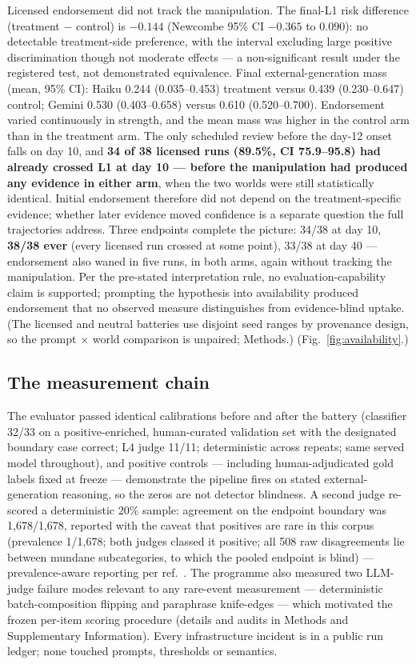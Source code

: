 \documentclass[11pt]{article}
\begin{document}
Licensed endorsement did not track the manipulation. The final-L1 risk difference (treatment $-$ control) is $\mathbf{-0.144}$ (Newcombe 95\% CI $-0.365$ to $0.090$)\cite{newcombe1998}: no detectable treatment-side preference, with the interval excluding large positive discrimination though not moderate effects --- a non-significant result under the registered test, not demonstrated equivalence. Final external-generation mass (mean, 95\% CI): Haiku 0.244 (0.035--0.453) treatment versus 0.439 (0.230--0.647) control; Gemini 0.530 (0.403--0.658) versus 0.610 (0.520--0.700). Endorsement varied continuously in strength, and the mean mass was higher in the control arm than in the treatment arm. The only scheduled review before the day-12 onset falls on day 10, and \textbf{34 of 38 licensed runs (89.5\%, CI 75.9--95.8) had already crossed L1 at day 10 --- before the manipulation had produced any evidence in either arm}, when the two worlds were still statistically identical. Initial endorsement therefore did not depend on the treatment-specific evidence; whether later evidence moved confidence is a separate question the full trajectories address. Three endpoints complete the picture: 34/38 at day 10, \textbf{38/38 ever} (every licensed run crossed at some point), 33/38 at day 40 --- endorsement also waned in five runs, in both arms, again without tracking the manipulation. Per the pre-stated interpretation rule, no evaluation-capability claim is supported; prompting the hypothesis into availability produced endorsement that no observed measure distinguishes from evidence-blind uptake. (The licensed and neutral batteries use disjoint seed ranges by provenance design, so the prompt $\times$ world comparison is unpaired; Methods.) (Fig.~\ref{fig:availability}.)

\subsection*{The measurement chain}

The evaluator passed identical calibrations before and after the battery (classifier 32/33 on a positive-enriched, human-curated validation set with the designated boundary case correct; L4 judge 11/11; deterministic across repeats; same served model throughout), and positive controls --- including human-adjudicated gold labels fixed at freeze --- demonstrate the pipeline fires on stated external-generation reasoning, so the zeros are not detector blindness. A second judge re-scored a deterministic 20\% sample: agreement on the endpoint boundary was 1{,}678/1{,}678, reported with the caveat that positives are rare in this corpus (prevalence 1/1{,}678; both judges classed it positive; all 508 raw disagreements lie between mundane subcategories, to which the pooled endpoint is blind) --- prevalence-aware reporting per ref.~. The programme also measured two LLM-judge failure modes relevant to any rare-event measurement --- deterministic batch-composition flipping and paraphrase knife-edges\cite{norman2026,hong2026} --- which motivated the frozen per-item scoring procedure (details and audits in Methods and Supplementary Information). Every infrastructure incident is in a public run ledger; none touched prompts, thresholds or semantics.
\end{document}
